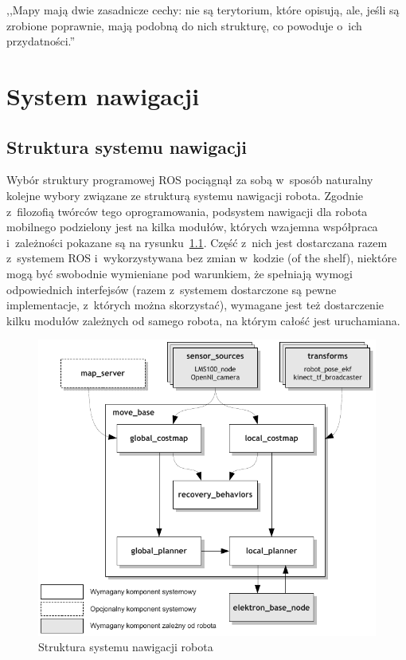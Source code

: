 

\begin{savequote}[70mm]
,,Mapy mają dwie zasadnicze cechy: nie są terytorium, które opisują, ale, jeśli
są zrobione poprawnie, mają podobną do nich strukturę, co powoduje o~ich
przydatności.''
\end{savequote}


\chapter{System nawigacji}
\label{chap:mapa}

\section{Struktura systemu nawigacji}

Wybór struktury programowej ROS pociągnął za sobą w~sposób naturalny kolejne
wybory związane ze strukturą systemu nawigacji robota. Zgodnie z~filozofią
twórców tego oprogramowania, podsystem nawigacji dla robota mobilnego podzielony
jest na kilka modułów, których wzajemna współpraca i~zależności pokazane są na
rysunku~\ref{fig:diag_move_base}. Część z~nich jest dostarczana razem z~systemem
ROS i~wykorzystywana bez zmian w~kodzie (of the shelf), niektóre mogą być
swobodnie wymieniane pod warunkiem, że spełniają wymogi odpowiednich interfejsów
(razem z~systemem dostarczone są pewne implementacje, z~których można
skorzystać), wymagane jest też dostarczenie kilku modułów zależnych od samego
robota, na którym całość jest uruchamiana.

\begin{figure}[h!]
\centering
\includegraphics{../img/diag_move_base}
\caption{Struktura systemu nawigacji robota}
\label{fig:diag_move_base}
\end{figure}

